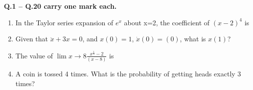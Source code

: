 \documentclass[journal,12pt,onecolumn]{IEEEtran}
\begin{document}
\newpage

\large\textbf{Q.1 -- Q.20 carry one mark each.}\\
\begin{enumerate}
    \item In the Taylor series expansion of $e^x$ about x=2, the coefficient of $(x-2)^4$ is

          \begin{enumerate}
          \end{enumerate}

    \item Given that $\ddot{x} + 3x = 0$, and $x(0)=1$, $\dot{x}(0)=(0)$, what is $x(1)$?

          \begin{enumerate}
          \end{enumerate}

    \item The value of $\lim{x\rightarrow8} \frac{x^{\frac{1}{3}}-2}{(x-8)}$ is

          \begin{enumerate}
          \end{enumerate}

    \item A coin is tossed 4 times. What is the probability of getting heads exactly 3 times?


\end{enumerate}
\end{document}
